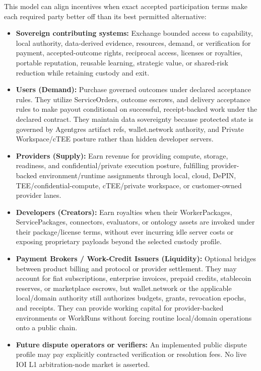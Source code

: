 \documentclass[
  11pt,
]{article}
\providecommand{\tightlist}{%
  \setlength{\itemsep}{0pt}\setlength{\parskip}{0pt}}
\begin{document}
This model can align incentives when exact accepted participation terms make
each required party better off than its best permitted alternative:

\begin{itemize}
\tightlist
\item
  \textbf{Sovereign contributing systems:} Exchange bounded access to
  capability, local authority, data-derived evidence, resources, demand, or
  verification for payment, accepted-outcome rights, reciprocal access,
  licenses or royalties, portable reputation, reusable learning, strategic
  value, or shared-risk reduction while retaining custody and exit.
\item
  \textbf{Users (Demand):} Purchase governed outcomes under declared
  acceptance rules. They utilize
  ServiceOrders, outcome escrows, and delivery acceptance rules to make
  payout conditional on successful, receipt-backed work under the
  declared contract. They
  maintain data sovereignty because protected state is governed by
  Agentgres artifact refs, wallet.network authority, and Private
  Workspace/cTEE posture rather than hidden developer servers.
\item
  \textbf{Providers (Supply):} Earn revenue for providing compute,
  storage, readiness, and confidential/private execution posture,
  fulfilling provider-backed environment/runtime assignments through local,
  cloud, DePIN,
  TEE/confidential-compute, cTEE/private workspace, or customer-owned
  provider lanes.
\item
  \textbf{Developers (Creators):} Earn royalties when their
  WorkerPackages, ServicePackages, connectors, evaluators, or ontology
  assets are invoked under their package/license terms, without ever
  incurring idle server costs or exposing proprietary payloads beyond
  the selected custody profile.
\item
  \textbf{Payment Brokers / Work-Credit Issuers (Liquidity):} Optional
  bridges between product billing and protocol or provider settlement.
  They may account for fiat subscriptions, enterprise invoices, prepaid
  credits, stablecoin reserves, or marketplace escrows, but wallet.network
  or the applicable local/domain authority still authorizes budgets, grants,
  revocation epochs, and receipts. They
  can provide working capital for provider-backed environments or WorkRuns
  without forcing
  routine local/domain operations onto a public chain.
\item
  \textbf{Future dispute operators or verifiers:} An implemented public
  dispute profile may pay explicitly contracted verification or resolution
  fees. No live IOI L1 arbitration-node market is asserted.
\end{itemize}
\end{document}
